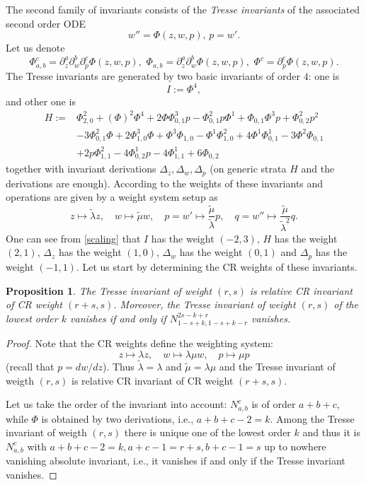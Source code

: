 \documentclass[12pt]{amsart}
\newtheorem{proposition}{Proposition}[section]
\def\beq{\begin{equation}}
\def\eeq{\end{equation}}
\begin{document}
The second family of invariants consists of the {\em Tresse invariants} \cite{Tr96} of the associated second order ODE $$w''=\Phi(z,w,p),\,p=w'.$$ Let us denote $$\Phi^c_{a,b}=\partial_z^a\partial_w^b\partial_p^c\Phi(z,w,p),\,\, \Phi_{a,b}=\partial_z^a\partial_w^b\Phi(z,w,p),\,\,\Phi^c=\partial_p^c\Phi(z,w,p).$$ The Tresse invariants are generated by two basic invariants of order $4$:
 one is
$$I:=\Phi^4,$$
and other one is
\begin{equation} \label{Hformula}\begin{aligned}  H:=&\Phi^2_{2,0}+(\Phi)^2 \Phi^4+2\Phi\Phi^3_{0,1}p-\Phi^2_{0,1}p\Phi^1+\Phi_{0,1}\Phi^3p+\Phi^2_{0,2}p^2\\
&-3\Phi^2_{0,1}\Phi+2\Phi^3_{1,0}\Phi
 +\Phi^3\Phi_{1,0}-\Phi^1\Phi^2_{1,0}+4\Phi^1\Phi^1_{0,1}-3\Phi^2\Phi_{0,1}\\
 &+2p\Phi^2_{1,1}-4\Phi^1_{0,2}p-4\Phi^1_{1,1}+6\Phi_{0,2} \end{aligned} \end{equation}
together with invariant derivations $\Delta_z,\Delta_w,\Delta_p$ (on generic strata $H$ and the derivations are enough). According to \cite{Kr09} the weights of these invariants and operations are given by a weight system setup as
\beq\label{scaling}
z\mapsto \tilde \lambda z,\quad w\mapsto \tilde \mu w,\quad p=w'\mapsto \frac{\tilde \mu}{\tilde \lambda}p, \quad q=w''\mapsto \frac{\tilde \mu}{\tilde \lambda^2}q.
\eeq
One can see from \eqref{scaling} that $I$ has the weight $(-2,3)$, $H$ has the weight $(2,1)$, $\Delta_z$ has the weight $(1,0)$, $\Delta_w$ has the weight $(0,1)$ and $\Delta_p$ has the weight $(-1,1).$ Let us start by determining the CR weights of these invariants.

\begin{proposition}\label{weightcheck}
The Tresse invariant of weight $(r,s)$ is relative CR invariant of CR weight $(r+s,s)$. Moreover, the Tresse invariant of weight $(r,s)$ of the lowest order $k$ vanishes if and only if $N^{2s-k+r}_{1-s+k,1-s+k-r}$ vanishes.
\end{proposition}
\begin{proof}
Note that the CR weights define the weighting system:
$$
z\mapsto \lambda z,\quad w\mapsto \lambda \mu w,\quad p\mapsto \mu p
$$
(recall that $p=dw/dz$).
Thus $ \tilde  \lambda=\lambda$ and $\tilde \mu= \lambda \mu$ and the Tresse invariant of weigth $(r,s)$ is relative CR invariant of CR weight $(r+s,s)$.

Let us take the order of the invariant into account: $N^c_{a,b}$ is of order $a+b+c$, while $\Phi$ is obtained by two derivations, i.e., $a+b+c-2=k$. Among the Tresse invariant of weigth $(r,s)$ there is unique one of the lowest order $k$ and thus it is  $N^c_{a,b}$ with $a+b+c-2=k,a+c-1=r+s,b+c-1=s$ 
up to nowhere vanishing absolute invariant, i.e., it vanishes if and only if the Tresse invariant vanishes.
\end{proof}
\end{document}
